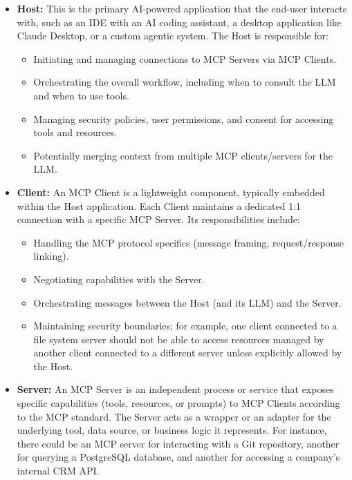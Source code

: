 \begin{itemize}
    \item \textbf{Host:} This is the primary AI-powered application that the end-user interacts with, such as an IDE with an 
    AI coding assistant, a desktop application like Claude Desktop, or a custom agentic system. The Host is responsible for:
    \begin{itemize}
        \item Initiating and managing connections to MCP Servers via MCP Clients.
        \item Orchestrating the overall workflow, including when to consult the LLM and when to use tools.
        \item Managing security policies, user permissions, and consent for accessing tools and resources.
        \item Potentially merging context from multiple MCP clients/servers for the LLM.
    \end{itemize}
    \item \textbf{Client:} An MCP Client is a lightweight component, typically embedded within the Host application. 
    Each Client maintains a dedicated 1:1 connection with a specific MCP Server. Its responsibilities include:
    \begin{itemize}
        \item Handling the MCP protocol specifics (message framing, request/response linking).
        \item Negotiating capabilities with the Server.
        \item Orchestrating messages between the Host (and its LLM) and the Server.
        \item Maintaining security boundaries; for example, one client connected to a file system server should not be
         able to access resources managed by another client connected to a different server unless explicitly allowed by the Host.
    \end{itemize}
    \item \textbf{Server:} An MCP Server is an independent process or service that exposes specific capabilities (tools, resources, or prompts) 
    to MCP Clients according to the MCP standard. The Server acts as a wrapper or an adapter for the underlying tool, data source, or business logic it represents.
     For instance, there could be an MCP server for interacting with a Git repository, another for querying a PostgreSQL database, and another 
     for accessing a company's internal CRM API.
\end{itemize}

